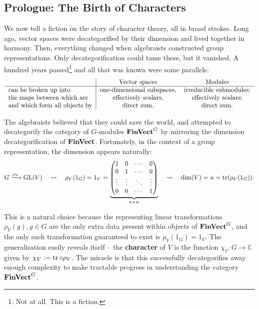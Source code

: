 \subsection{Prologue: The Birth of Characters} %
\par We now tell a fiction on the story of character theory, all in broad strokes. Long ago, vector spaces were decategorified by their dimension and lived together in harmony. Then, everything changed when algebraists constructed group representations. Only decategorification could tame these, but it vanished. A hundred years passed\footnote{Not at all. This is a fiction.} and all that was known were some parallels:
\begin{align*}
  \begin{tabular}{l|cc}
    & Vector spaces & Modules \\
    \hline
    can be broken up into
      & one-dimensional subspaces,
      & irreducible submodules;
    \\
    the maps between which are
      & effectively scalars,
      & effectively scalars;
    \\
    and which form all objects by
      & direct sum,
      & direct sum.
  \end{tabular}
\end{align*}
\par The algebraists believed that they could save the world, and attempted to decategorify the category of $G$-modules $\operatorname{\mathbf{FinVect}}^G$ by mirroring the dimension decategorification of $\operatorname{\mathbf{FinVect}}$. Fortunately, in the context of a group representation, the dimension appears naturally:
\begin{align*}
  G \xrightarrow{\rho_V} \operatorname{GL}(V)
  \quad\rightsquigarrow\quad
  \rho_V (1_G)
  = 1_V
  = \underbrace{
    \begin{pmatrix}
      1 & 0 & \cdots & 0 \\
      0 & 1 & \cdots & 0 \\
      \vdots & \vdots & \ddots & \vdots \\
      0 & 0 & \cdots & 1
    \end{pmatrix}
  }_{n \times n}
  \quad\rightsquigarrow\quad
  \dim(V)
  = n
  = \operatorname{tr} (\rho_V (1_G))
  .
\end{align*}
\par This is a natural choice because the representing linear transformations $\rho_V (g), g \in G$ are the only extra data present within objects of $\operatorname{\mathbf{FinVect}}^G$, and the only such transformation guaranteed to exist is $\rho_V (1_G) = 1_V$. The generalisation easily reveals itself -- the \textbf{character} of $V$ is the function $\chi_V : G \to \mathbb{C}$ given by $\chi_V := \operatorname{tr} \circ \rho_V$. The miracle is that this successfully decategorifies away enough complexity to make tractable progress in understanding the category $\operatorname{\mathbf{FinVect}}^G$.
